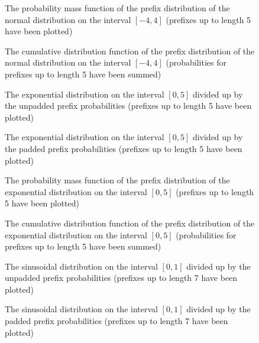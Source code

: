\begin{figure}
    \centering
    
    \caption{The probability mass function of the prefix distribution of the normal distribution on the interval $[-4,4]$ (prefixes up to length 5 have been plotted)}
    \label{fig:normal_bin_pmf_full}\vspace{2em}
    
    
    \caption{The cumulative distribution function of the prefix distribution of the normal distribution on the interval $[-4,4]$ (probabilities for prefixes up to length 5 have been summed)}
    \label{fig:normal_bin_cdf_full}
\end{figure}

\begin{figure}
    \centering
    
    \caption{The exponential distribution on the interval $[0,5]$ divided up by the unpadded prefix probabilities (prefixes up to length 5 have been plotted)}
    \label{fig:exp_bin_cover_full}\vspace{2em}
    
    
    \caption{The exponential distribution on the interval $[0,5]$ divided up by the padded prefix probabilities (prefixes up to length 5 have been plotted)}
    \label{fig:exp_bin_cover_padded_full}
\end{figure}

\begin{figure}
    \centering
    
    \caption{The probability mass function of the prefix distribution of the exponential distribution on the interval $[0,5]$ (prefixes up to length 5 have been plotted)}
    \label{fig:exp_bin_pmf_full}\vspace{2em}
    
    
    \caption{The cumulative distribution function of the prefix distribution of the exponential distribution on the interval $[0,5]$ (probabilities for prefixes up to length 5 have been summed)}
    \label{fig:exp_bin_cdf_full}
\end{figure}

\begin{figure}
    \centering
    
    \caption{The sinusoidal distribution on the interval $[0,1]$ divided up by the unpadded prefix probabilities (prefixes up to length 7 have been plotted)}
    \label{fig:sin_bin_cover_full}\vspace{2em}
    
    
    \caption{The sinusoidal distribution on the interval $[0,1]$ divided up by the padded prefix probabilities (prefixes up to length 7 have been plotted)}
    \label{fig:sin_bin_cover_padded_full}
\end{figure}

